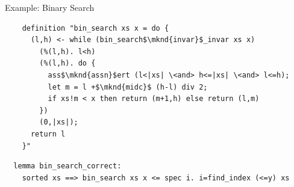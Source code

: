\documentclass[fleqn]{beamer}
\begin{document}
\begin{frame}[fragile]{Example: Binary Search}
  \newcommand{\mknd}[1]{\makebox[0pt]{\tikz[remember picture]{\node (#1) {};}}}
  \begin{lstlisting}
    definition "bin_search xs x = do {
      (l,h) <- while (bin_search$\mknd{invar}$_invar xs x)
        (%(l,h). l<h)
        (%(l,h). do {
          ass$\mknd{assn}$ert (l<|xs| \<and> h<=|xs| \<and> l<=h);
          let m = l +$\mknd{midc}$ (h-l) div 2;
          if xs!m < x then return (m+1,h) else return (l,m)
        })
        (0,|xs|);
      return l
    }"
  \end{lstlisting}




  \begin{lstlisting}
  lemma bin_search_correct:
    sorted xs ==> bin_search xs x <= spec i. i=find_index (<=y) xs
  \end{lstlisting}

\end{frame}
\end{document}
